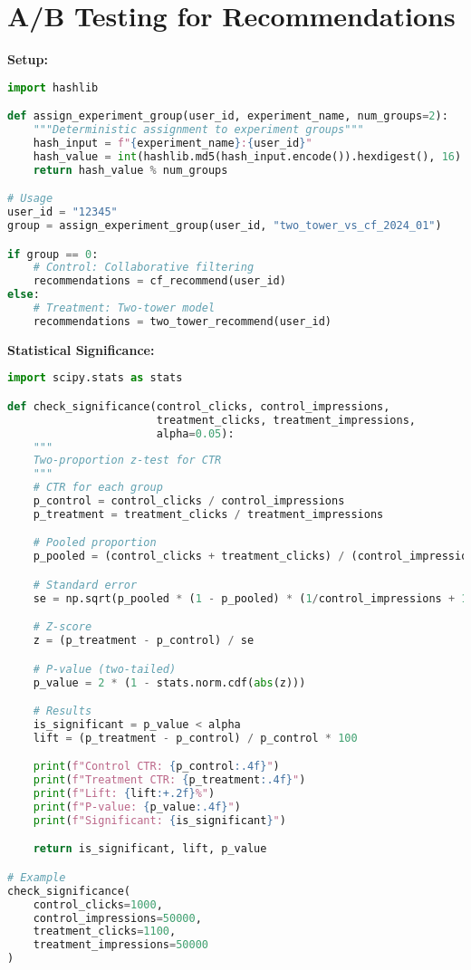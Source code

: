 \documentclass[10pt]{article}
\begin{document}
\section{A/B Testing for Recommendations}

\textbf{Setup:}
\begin{lstlisting}[language=Python]
import hashlib

def assign_experiment_group(user_id, experiment_name, num_groups=2):
    """Deterministic assignment to experiment groups"""
    hash_input = f"{experiment_name}:{user_id}"
    hash_value = int(hashlib.md5(hash_input.encode()).hexdigest(), 16)
    return hash_value % num_groups

# Usage
user_id = "12345"
group = assign_experiment_group(user_id, "two_tower_vs_cf_2024_01")

if group == 0:
    # Control: Collaborative filtering
    recommendations = cf_recommend(user_id)
else:
    # Treatment: Two-tower model
    recommendations = two_tower_recommend(user_id)
\end{lstlisting}

\textbf{Statistical Significance:}
\begin{lstlisting}[language=Python]
import scipy.stats as stats

def check_significance(control_clicks, control_impressions,
                       treatment_clicks, treatment_impressions,
                       alpha=0.05):
    """
    Two-proportion z-test for CTR
    """
    # CTR for each group
    p_control = control_clicks / control_impressions
    p_treatment = treatment_clicks / treatment_impressions

    # Pooled proportion
    p_pooled = (control_clicks + treatment_clicks) / (control_impressions + treatment_impressions)

    # Standard error
    se = np.sqrt(p_pooled * (1 - p_pooled) * (1/control_impressions + 1/treatment_impressions))

    # Z-score
    z = (p_treatment - p_control) / se

    # P-value (two-tailed)
    p_value = 2 * (1 - stats.norm.cdf(abs(z)))

    # Results
    is_significant = p_value < alpha
    lift = (p_treatment - p_control) / p_control * 100

    print(f"Control CTR: {p_control:.4f}")
    print(f"Treatment CTR: {p_treatment:.4f}")
    print(f"Lift: {lift:+.2f}%")
    print(f"P-value: {p_value:.4f}")
    print(f"Significant: {is_significant}")

    return is_significant, lift, p_value

# Example
check_significance(
    control_clicks=1000,
    control_impressions=50000,
    treatment_clicks=1100,
    treatment_impressions=50000
)
\end{lstlisting}
\end{document}

